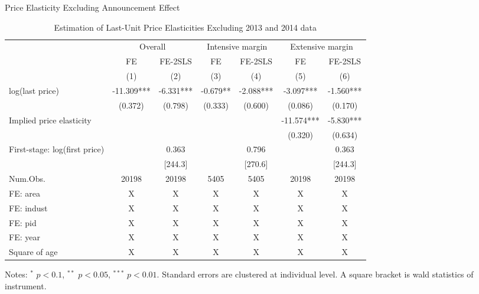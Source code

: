 \documentclass[
  ignorenonframetext,
  aspectratio=169,
]{beamer}
\begin{document}
\begin{frame}{Price Elasticity Excluding Announcement Effect}
\protect\hypertarget{price-elasticity-excluding-announcement-effect}{}
\begin{table}

\caption{\label{tab:WoAnnoucementElasticity}Estimation of Last-Unit Price Elasticities Excluding 2013 and 2014 data}
\centering
\fontsize{7}{9}\selectfont
\begin{threeparttable}
\begin{tabular}[t]{lcccccc}
\toprule
\multicolumn{1}{c}{ } & \multicolumn{2}{c}{Overall} & \multicolumn{2}{c}{Intensive margin} & \multicolumn{2}{c}{Extensive margin} \\
\cmidrule(l{3pt}r{3pt}){2-3} \cmidrule(l{3pt}r{3pt}){4-5} \cmidrule(l{3pt}r{3pt}){6-7}
\multicolumn{1}{c}{ } & \multicolumn{1}{c}{FE} & \multicolumn{1}{c}{FE-2SLS} & \multicolumn{1}{c}{FE} & \multicolumn{1}{c}{FE-2SLS} & \multicolumn{1}{c}{FE} & \multicolumn{1}{c}{FE-2SLS} \\
\cmidrule(l{3pt}r{3pt}){2-2} \cmidrule(l{3pt}r{3pt}){3-3} \cmidrule(l{3pt}r{3pt}){4-4} \cmidrule(l{3pt}r{3pt}){5-5} \cmidrule(l{3pt}r{3pt}){6-6} \cmidrule(l{3pt}r{3pt}){7-7}
  & (1) & (2) & (3) & (4) & (5) & (6)\\
\midrule
log(last price) & -11.309*** & -6.331*** & -0.679** & -2.088*** & -3.097*** & -1.560***\\
 & (0.372) & (0.798) & (0.333) & (0.600) & (0.086) & (0.170)\\
\midrule
Implied price elasticity &  &  &  &  & -11.574*** & -5.830***\\
 &  &  &  &  & (0.320) & (0.634)\\
First-stage: log(first price) &  & 0.363 &  & 0.796 &  & 0.363\\
 &  & [244.3] &  & [270.6] &  & [244.3]\\
Num.Obs. & 20198 & 20198 & 5405 & 5405 & 20198 & 20198\\
FE: area & X & X & X & X & X & X\\
FE: indust & X & X & X & X & X & X\\
FE: pid & X & X & X & X & X & X\\
FE: year & X & X & X & X & X & X\\
Square of age & X & X & X & X & X & X\\
\bottomrule
\end{tabular}
\begin{tablenotes}
\item Notes: $^{*}$ $p < 0.1$, $^{**}$ $p < 0.05$, $^{***}$ $p < 0.01$. Standard errors are clustered at individual level. A square bracket is wald statistics of instrument.
\end{tablenotes}
\end{threeparttable}
\end{table}
\end{frame}
\end{document}
